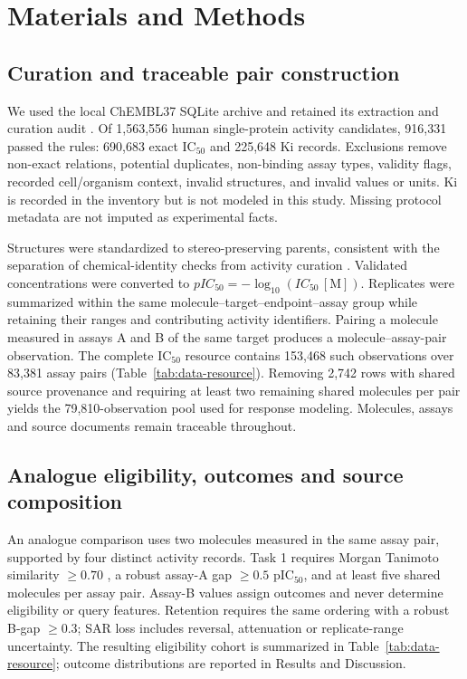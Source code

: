 \documentclass[letterpaper]{article}
\begin{document}
\section{Materials and Methods}

\subsection{Curation and traceable pair construction}

We used the local ChEMBL37 SQLite archive and retained its extraction and curation audit \citep{papadatos2015curation,mendez2019chembl,chembl2023,chembl37}. Of 1,563,556 human single-protein activity candidates, 916,331 passed the rules: 690,683 exact IC$_{50}$ and 225,648 Ki records. Exclusions remove non-exact relations, potential duplicates, non-binding assay types, validity flags, recorded cell/organism context, invalid structures, and invalid values or units. Ki is recorded in the inventory but is not modeled in this study. Missing protocol metadata are not imputed as experimental facts.

Structures were standardized to stereo-preserving parents, consistent with the separation of chemical-identity checks from activity curation \citep{fourches2010curation,fourches2016curation,kalliokoski2013quality}. Validated concentrations were converted to $pIC_{50}=-\log_{10}(IC_{50}\,[\mathrm{M}])$. Replicates were summarized within the same molecule--\allowbreak target--\allowbreak endpoint--\allowbreak assay group while retaining their ranges and contributing activity identifiers. Pairing a molecule measured in assays A and B of the same target produces a molecule--assay-pair observation. The complete IC$_{50}$ resource contains 153,468 such observations over 83,381 assay pairs (Table~\ref{tab:data-resource}). Removing 2,742 rows with shared source provenance and requiring at least two remaining shared molecules per pair yields the 79,810-observation pool used for response modeling. Molecules, assays and source documents remain traceable throughout.



\subsection{Analogue eligibility, outcomes and source composition}

An analogue comparison uses two molecules measured in the same assay pair, supported by four distinct activity records. Task 1 requires Morgan Tanimoto similarity $\geq0.70$ \citep{rogers2010ecfp}, a robust assay-A gap $\geq0.5$ pIC$_{50}$, and at least five shared molecules per assay pair. Assay-B values assign outcomes and never determine eligibility or query features. Retention requires the same ordering with a robust B-gap $\geq0.3$; SAR loss includes reversal, attenuation or replicate-range uncertainty. The resulting eligibility cohort is summarized in Table~\ref{tab:data-resource}; outcome distributions are reported in Results and Discussion.
\end{document}
